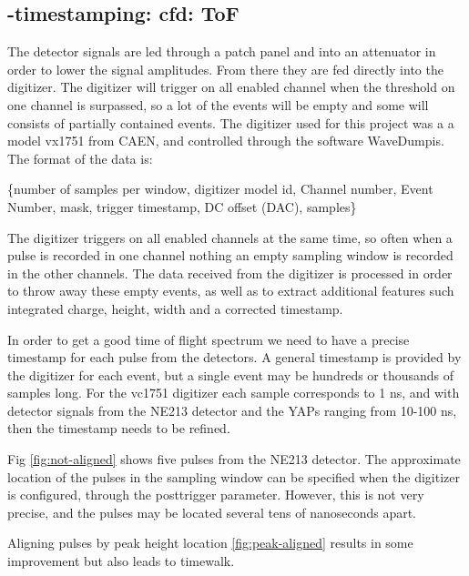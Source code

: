 \documentclass[main.tex]{subfiles}
\begin{document}
\subsection{-timestamping: cfd: ToF}

The detector signals are led through a patch panel and into an attenuator in order to lower the signal amplitudes. From there they are fed directly into the digitizer. The digitizer will trigger on all enabled channel when the threshold on one channel is surpassed, so a lot of the events will be empty and some will consists of partially contained events. The digitizer used for this project was a a model vx1751 from CAEN, and controlled through the software WaveDumpis. The format of the data is:

\{number of samples per window, digitizer model id, Channel number, Event Number, mask, trigger timestamp, DC offset (DAC), samples\}


The digitizer triggers on all enabled channels at the same time, so often when a pulse is recorded in one channel nothing an empty sampling window is recorded in the other channels. The data received from the digitizer is processed in order to throw away these empty events, as well as to extract additional features such integrated charge, height, width and a corrected timestamp.

In order to get a good time of flight spectrum we need to have a precise timestamp for each pulse from the detectors. A general timestamp is provided by the digitizer for each event, but a single event may be hundreds or thousands of samples long. For the vc1751 digitizer each sample corresponds to 1 ns, and with detector signals from the NE213 detector and the YAPs ranging from 10-100 ns, then the timestamp needs to be refined.

Fig \ref{fig:not-aligned} shows five pulses from the NE213 detector. The approximate location of the pulses in the sampling window can be specified when the digitizer is configured, through the posttrigger parameter. However, this is not very precise, and the pulses may be located several tens of nanoseconds apart. 

Aligning pulses by peak height location \ref{fig:peak-aligned} results in some improvement but also leads to timewalk.
\end{document}
